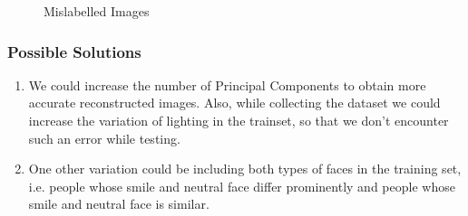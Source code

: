 \documentclass[11pt,letterpaper]{article}
\begin{document}
\begin{figure}[htbp]
    \caption{Mislabelled Images}
\end{figure}
\newpage
\subsubsection*{Possible Solutions}
\begin{enumerate}
    [label=$\bullet$]
    \item We could increase the number of Principal Components to obtain more accurate reconstructed images. Also, while collecting the dataset we could increase the variation of lighting in the trainset, so that we don't encounter such an error while testing. 
    \item One other variation could be including both types of faces in the training set, i.e. people whose smile and neutral face differ prominently and people whose smile and neutral face is similar.
\end{enumerate}
\end{document}
